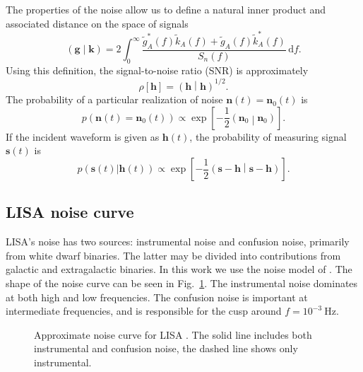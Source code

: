 \documentclass[useAMS,usedcolumn,usegraphicx,usenatbib]{mn2e}
\newcommand{\figref}[1]{Fig.~\ref{fig:#1}}
\newcommand{\units}[1]{\ensuremath{~\mathrm{#1}}}
\newcommand{\dd}{\ensuremath{\mathrm{d}}}
\newcommand{\intd}[4]{\ensuremath{\int_{#1}^{#2}{#3}\,\dd{#4}}}
\newcommand{\recip}[1]{\ensuremath{\frac{1}{#1}}}
\newcommand{\innerprod}[2]{\ensuremath{\left({#1}\middle|{#2}\right)}}
\begin{document}
The properties of the noise allow us to define a natural inner product and associated distance on the space of signals \citep{Cutler1994}
\begin{equation}
\innerprod{\boldsymbol{g}}{\boldsymbol{k}} = 2\intd{0}{\infty}{\frac{\tilde{g}_A^*(f)\tilde{k}_A(f) + \tilde{g}_A(f)\tilde{k}_A^*(f)}{S_n(f)}}{f}.
\label{eq:inner}
\end{equation}
Using this definition, the signal-to-noise ratio (SNR) is approximately
\begin{equation}
\rho[\boldsymbol{h}] = \innerprod{\boldsymbol{h}}{\boldsymbol{h}}^{1/2}.
\end{equation}
The probability of a particular realization of noise $\boldsymbol{n}(t) = \boldsymbol{n}_0(t)$ is
\begin{equation}
p(\boldsymbol{n}(t) = \boldsymbol{n}_0(t)) \propto \exp\left[-\recip{2}\innerprod{\boldsymbol{n}_0}{\boldsymbol{n}_0}\right].
\end{equation}
If the incident waveform is given as $\boldsymbol{h}(t)$, the probability of measuring signal $\boldsymbol{s}(t)$ is
\begin{equation}
p(\boldsymbol{s}(t)|\boldsymbol{h}(t)) \propto \exp\left[-\recip{2}\innerprod{\boldsymbol{s}-\boldsymbol{h}}{\boldsymbol{s}-\boldsymbol{h}}\right].
\label{eq:sig_prob}
\end{equation}

\subsection{LISA noise curve}\label{sec:Noise}

LISA's noise has two sources: instrumental noise and confusion noise, primarily from white dwarf binaries. The latter may be divided into contributions from galactic and extragalactic binaries. In this work we use the noise model of \citet{Barack2004}. The shape of the noise curve can be seen in \figref{Noise}. The instrumental noise dominates at both high and low frequencies. The confusion noise is important at intermediate frequencies, and is responsible for the cusp around $f = 10^{-3}\units{Hz}$.
\begin{figure}
\begin{center}
\caption{Approximate noise curve for LISA \citep{Barack2004}. The solid line includes both instrumental and confusion noise, the dashed line shows only instrumental.}%
\label{fig:Noise}
\end{center}
\end{figure}
\end{document}
